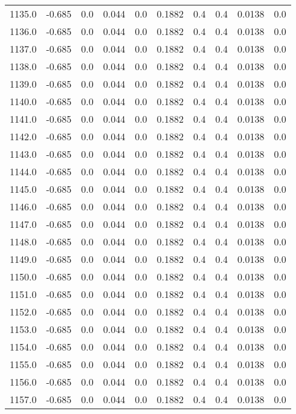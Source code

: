 \begin{longtable}{lrrrrrrrrr}
1135.0 & -0.685 & 0.0 & 0.044 & 0.0 & 0.1882 & 0.4 & 0.4 & 0.0138 & 0.0 \\
1136.0 & -0.685 & 0.0 & 0.044 & 0.0 & 0.1882 & 0.4 & 0.4 & 0.0138 & 0.0 \\
1137.0 & -0.685 & 0.0 & 0.044 & 0.0 & 0.1882 & 0.4 & 0.4 & 0.0138 & 0.0 \\
1138.0 & -0.685 & 0.0 & 0.044 & 0.0 & 0.1882 & 0.4 & 0.4 & 0.0138 & 0.0 \\
1139.0 & -0.685 & 0.0 & 0.044 & 0.0 & 0.1882 & 0.4 & 0.4 & 0.0138 & 0.0 \\
1140.0 & -0.685 & 0.0 & 0.044 & 0.0 & 0.1882 & 0.4 & 0.4 & 0.0138 & 0.0 \\
1141.0 & -0.685 & 0.0 & 0.044 & 0.0 & 0.1882 & 0.4 & 0.4 & 0.0138 & 0.0 \\
1142.0 & -0.685 & 0.0 & 0.044 & 0.0 & 0.1882 & 0.4 & 0.4 & 0.0138 & 0.0 \\
1143.0 & -0.685 & 0.0 & 0.044 & 0.0 & 0.1882 & 0.4 & 0.4 & 0.0138 & 0.0 \\
1144.0 & -0.685 & 0.0 & 0.044 & 0.0 & 0.1882 & 0.4 & 0.4 & 0.0138 & 0.0 \\
1145.0 & -0.685 & 0.0 & 0.044 & 0.0 & 0.1882 & 0.4 & 0.4 & 0.0138 & 0.0 \\
1146.0 & -0.685 & 0.0 & 0.044 & 0.0 & 0.1882 & 0.4 & 0.4 & 0.0138 & 0.0 \\
1147.0 & -0.685 & 0.0 & 0.044 & 0.0 & 0.1882 & 0.4 & 0.4 & 0.0138 & 0.0 \\
1148.0 & -0.685 & 0.0 & 0.044 & 0.0 & 0.1882 & 0.4 & 0.4 & 0.0138 & 0.0 \\
1149.0 & -0.685 & 0.0 & 0.044 & 0.0 & 0.1882 & 0.4 & 0.4 & 0.0138 & 0.0 \\
1150.0 & -0.685 & 0.0 & 0.044 & 0.0 & 0.1882 & 0.4 & 0.4 & 0.0138 & 0.0 \\
1151.0 & -0.685 & 0.0 & 0.044 & 0.0 & 0.1882 & 0.4 & 0.4 & 0.0138 & 0.0 \\
1152.0 & -0.685 & 0.0 & 0.044 & 0.0 & 0.1882 & 0.4 & 0.4 & 0.0138 & 0.0 \\
1153.0 & -0.685 & 0.0 & 0.044 & 0.0 & 0.1882 & 0.4 & 0.4 & 0.0138 & 0.0 \\
1154.0 & -0.685 & 0.0 & 0.044 & 0.0 & 0.1882 & 0.4 & 0.4 & 0.0138 & 0.0 \\
1155.0 & -0.685 & 0.0 & 0.044 & 0.0 & 0.1882 & 0.4 & 0.4 & 0.0138 & 0.0 \\
1156.0 & -0.685 & 0.0 & 0.044 & 0.0 & 0.1882 & 0.4 & 0.4 & 0.0138 & 0.0 \\
1157.0 & -0.685 & 0.0 & 0.044 & 0.0 & 0.1882 & 0.4 & 0.4 & 0.0138 & 0.0 \\

\end{longtable}
